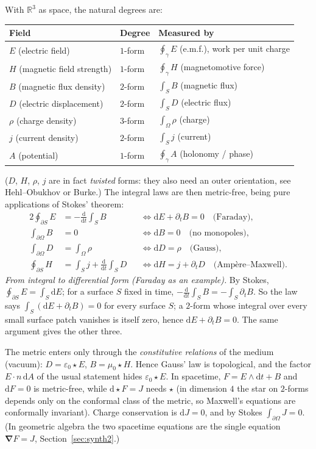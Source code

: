 \documentclass[11pt,a4paper]{article}
\renewcommand{\arraystretch}{1.25}
\numberwithin{equation}{section}
\theoremstyle{definition}
\theoremstyle{plain}
\newcommand{\R}{\mathbb{R}}
\newcommand{\dd}{\mathrm{d}}
\newcommand{\hodge}{\star}
\newcommand{\vd}{\boldsymbol{\nabla}}               %
\begin{document}
With $\R^3$ as space, the natural degrees are:
\begin{center}
\small
\renewcommand{\arraystretch}{1.3}
\begin{tabular}{@{}p{5.2cm}p{1.8cm}p{6.0cm}@{}}
\toprule
\textbf{Field} & \textbf{Degree} & \textbf{Measured by}\\
\midrule
$E$ (electric field) & $1$-form & $\oint_\gamma E$ (e.m.f.), work per unit charge\\
$H$ (magnetic field strength) & $1$-form & $\oint_\gamma H$ (magnetomotive force)\\
$B$ (magnetic flux density) & $2$-form & $\int_SB$ (magnetic flux)\\
$D$ (electric displacement) & $2$-form & $\int_SD$ (electric flux)\\
$\rho$ (charge density) & $3$-form & $\int_\Omega\rho$ (charge)\\
$j$ (current density) & $2$-form & $\int_Sj$ (current)\\
$A$ (potential) & $1$-form & $\oint_\gamma A$ (holonomy / phase)\\
\bottomrule
\end{tabular}
\end{center}
($D$, $H$, $\rho$, $j$ are in fact \emph{twisted} forms: they also need an outer orientation, see Hehl--Obukhov or Burke.) The integral laws are then metric-free, being pure applications of Stokes' theorem:
\begin{alignat*}{2}
\oint_{\partial S}E&=-\frac{\dd}{\dd t}\int_SB&&\iff\dd E+\partial_tB=0\quad\text{(Faraday),}\\
\int_{\partial\Omega}B&=0&&\iff\dd B=0\quad\text{(no monopoles),}\\
\int_{\partial\Omega}D&=\int_\Omega\rho&&\iff\dd D=\rho\quad\text{(Gauss),}\\
\oint_{\partial S}H&=\int_Sj+\frac{\dd}{\dd t}\int_SD&&\iff\dd H=j+\partial_tD\quad\text{(Amp\`ere--Maxwell).}
\end{alignat*}
\emph{From integral to differential form (Faraday as an example).} By Stokes, $\oint_{\partial S}E=\int_S\dd E$; for a surface $S$ fixed in time, $-\frac{\dd}{\dd t}\int_SB=-\int_S\partial_tB$. So the law says $\int_S(\dd E+\partial_tB)=0$ for every surface $S$; a $2$-form whose integral over every small surface patch vanishes is itself zero, hence $\dd E+\partial_tB=0$. The same argument gives the other three.

The metric enters only through the \emph{constitutive relations} of the medium (vacuum): $D=\varepsilon_0\hodge E$, $B=\mu_0\hodge H$. Hence Gauss' law is topological, and the factor $E\cdot n\,\dd A$ of the usual statement hides $\varepsilon_0\hodge E$. In spacetime, $F=E\wedge\dd t+B$ and $\dd F=0$ is metric-free, while $\dd\hodge F=J$ needs $\hodge$ (in dimension $4$ the star on $2$-forms depends only on the conformal class of the metric, so Maxwell's equations are conformally invariant). Charge conservation is $\dd J=0$, and by Stokes $\int_{\partial\Omega}J=0$.
(In geometric algebra the two spacetime equations are the single equation $\vd F=J$, Section~\ref{sec:synth2}.)
\end{document}
